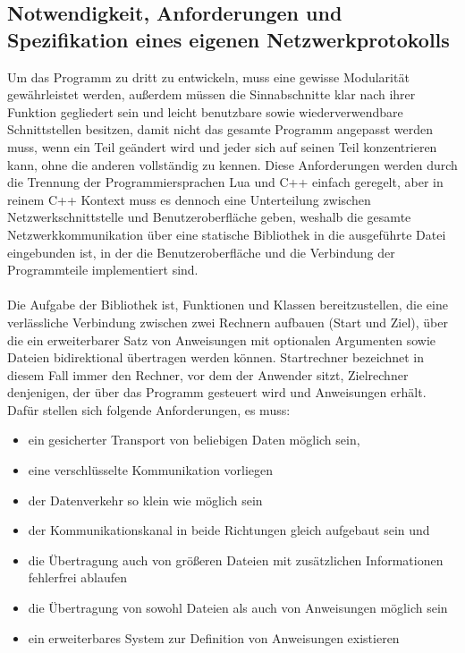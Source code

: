 \subsection{Notwendigkeit, Anforderungen und Spezifikation eines eigenen Netzwerkprotokolls}
Um das Programm zu dritt zu entwickeln, muss eine gewisse Modularität gewährleistet werden, außerdem müssen die Sinnabschnitte klar nach ihrer Funktion gegliedert sein und leicht benutzbare sowie wiederverwendbare Schnittstellen besitzen, damit nicht das gesamte Programm angepasst werden muss, wenn ein Teil geändert wird und jeder sich auf seinen Teil konzentrieren kann, ohne die anderen vollständig zu kennen.
Diese Anforderungen werden durch die Trennung der Programmiersprachen Lua und C++ einfach geregelt, aber in reinem C++ Kontext muss es dennoch eine Unterteilung zwischen Netzwerkschnittstelle und Benutzeroberfläche geben, weshalb die gesamte Netzwerkkommunikation über eine statische Bibliothek in die ausgeführte Datei eingebunden ist, in der die Benutzeroberfläche und die Verbindung der Programmteile implementiert sind.\\\\
Die Aufgabe der Bibliothek ist, Funktionen und Klassen bereitzustellen, die eine verlässliche Verbindung zwischen zwei Rechnern aufbauen (Start und Ziel), über die ein erweiterbarer Satz von Anweisungen mit optionalen Argumenten sowie Dateien bidirektional übertragen werden können.
Startrechner bezeichnet in diesem Fall immer den Rechner, vor dem der Anwender sitzt, Zielrechner denjenigen, der über das Programm gesteuert wird und Anweisungen erhält.
Dafür stellen sich folgende Anforderungen, es muss:\\

\begin{itemize}
\item ein gesicherter Transport von beliebigen Daten möglich sein,
\item eine verschlüsselte Kommunikation vorliegen
\item der Datenverkehr so klein wie möglich sein
\item der Kommunikationskanal in beide Richtungen gleich aufgebaut sein und
\item die Übertragung auch von größeren Dateien mit zusätzlichen Informationen fehlerfrei ablaufen
\item die Übertragung von sowohl Dateien als auch von Anweisungen möglich sein
\item ein erweiterbares System zur Definition von Anweisungen existieren
\end{itemize}

